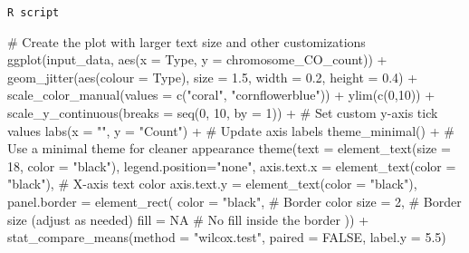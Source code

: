 \documentclass[
  letterpaper,
  DIV=11,
  numbers=noendperiod]{scrreprt}
\newenvironment{Shaded}{\begin{snugshade}}{\end{snugshade}}
\newcommand{\AttributeTok}[1]{\textcolor[rgb]{0.40,0.45,0.13}{#1}}
\newcommand{\CommentTok}[1]{\textcolor[rgb]{0.37,0.37,0.37}{#1}}
\newcommand{\ConstantTok}[1]{\textcolor[rgb]{0.56,0.35,0.01}{#1}}
\newcommand{\DecValTok}[1]{\textcolor[rgb]{0.68,0.00,0.00}{#1}}
\newcommand{\FloatTok}[1]{\textcolor[rgb]{0.68,0.00,0.00}{#1}}
\newcommand{\FunctionTok}[1]{\textcolor[rgb]{0.28,0.35,0.67}{#1}}
\newcommand{\NormalTok}[1]{\textcolor[rgb]{0.00,0.23,0.31}{#1}}
\newcommand{\SpecialCharTok}[1]{\textcolor[rgb]{0.37,0.37,0.37}{#1}}
\newcommand{\StringTok}[1]{\textcolor[rgb]{0.13,0.47,0.30}{#1}}
\begin{document}
\begin{codelisting}

\caption{\texttt{R script}}

\begin{Shaded}
\begin{Highlighting}[]
\CommentTok{\# Create the plot with larger text size and other customizations}
\FunctionTok{ggplot}\NormalTok{(input\_data, }\FunctionTok{aes}\NormalTok{(}\AttributeTok{x =}\NormalTok{ Type, }\AttributeTok{y =}\NormalTok{ chromosome\_CO\_count)) }\SpecialCharTok{+}
  \FunctionTok{geom\_jitter}\NormalTok{(}\FunctionTok{aes}\NormalTok{(}\AttributeTok{colour =}\NormalTok{ Type), }\AttributeTok{size =} \FloatTok{1.5}\NormalTok{, }\AttributeTok{width =} \FloatTok{0.2}\NormalTok{, }\AttributeTok{height =} \FloatTok{0.4}\NormalTok{) }\SpecialCharTok{+}
  \FunctionTok{scale\_color\_manual}\NormalTok{(}\AttributeTok{values =} \FunctionTok{c}\NormalTok{(}\StringTok{"coral"}\NormalTok{, }\StringTok{"cornflowerblue"}\NormalTok{)) }\SpecialCharTok{+}
  \FunctionTok{ylim}\NormalTok{(}\FunctionTok{c}\NormalTok{(}\DecValTok{0}\NormalTok{,}\DecValTok{10}\NormalTok{)) }\SpecialCharTok{+}
  \FunctionTok{scale\_y\_continuous}\NormalTok{(}\AttributeTok{breaks =} \FunctionTok{seq}\NormalTok{(}\DecValTok{0}\NormalTok{, }\DecValTok{10}\NormalTok{, }\AttributeTok{by =} \DecValTok{1}\NormalTok{)) }\SpecialCharTok{+}  \CommentTok{\# Set custom y{-}axis tick values}
  \FunctionTok{labs}\NormalTok{(}\AttributeTok{x =} \StringTok{""}\NormalTok{, }\AttributeTok{y =} \StringTok{"Count"}\NormalTok{) }\SpecialCharTok{+}  \CommentTok{\# Update axis labels}
  \FunctionTok{theme\_minimal}\NormalTok{() }\SpecialCharTok{+}  \CommentTok{\# Use a minimal theme for cleaner appearance}
  \FunctionTok{theme}\NormalTok{(}\AttributeTok{text =} \FunctionTok{element\_text}\NormalTok{(}\AttributeTok{size =} \DecValTok{18}\NormalTok{, }\AttributeTok{color =} \StringTok{"black"}\NormalTok{),}
        \AttributeTok{legend.position=}\StringTok{"none"}\NormalTok{,}
        \AttributeTok{axis.text.x =} \FunctionTok{element\_text}\NormalTok{(}\AttributeTok{color =} \StringTok{"black"}\NormalTok{),  }\CommentTok{\# X{-}axis text color}
        \AttributeTok{axis.text.y =} \FunctionTok{element\_text}\NormalTok{(}\AttributeTok{color =} \StringTok{"black"}\NormalTok{),}
        \AttributeTok{panel.border =} \FunctionTok{element\_rect}\NormalTok{(}
          \AttributeTok{color =} \StringTok{"black"}\NormalTok{,  }\CommentTok{\# Border color}
          \AttributeTok{size =} \DecValTok{2}\NormalTok{,         }\CommentTok{\# Border size (adjust as needed)}
          \AttributeTok{fill =} \ConstantTok{NA}         \CommentTok{\# No fill inside the border}
\NormalTok{          )) }\SpecialCharTok{+} \FunctionTok{stat\_compare\_means}\NormalTok{(}\AttributeTok{method =} \StringTok{"wilcox.test"}\NormalTok{, }\AttributeTok{paired =} \ConstantTok{FALSE}\NormalTok{, }\AttributeTok{label.y =} \FloatTok{5.5}\NormalTok{)}
  




\end{Highlighting}
\end{Shaded}
\end{codelisting}
\end{document}
